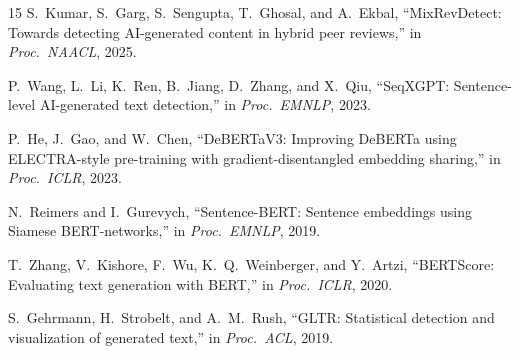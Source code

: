 \documentclass[conference]{IEEEtran}
\begin{document}
\begin{thebibliography}{15}
S.~Kumar, S.~Garg, S.~Sengupta, T.~Ghosal, and A.~Ekbal,
``{MixRevDetect}: Towards detecting {AI}-generated content in hybrid peer reviews,''
in \textit{Proc.\ NAACL}, 2025.

P.~Wang, L.~Li, K.~Ren, B.~Jiang, D.~Zhang, and X.~Qiu,
``{SeqXGPT}: Sentence-level {AI}-generated text detection,''
in \textit{Proc.\ EMNLP}, 2023.

P.~He, J.~Gao, and W.~Chen,
``{DeBERTaV3}: Improving {DeBERTa} using {ELECTRA}-style pre-training with gradient-disentangled embedding sharing,''
in \textit{Proc.\ ICLR}, 2023.

N.~Reimers and I.~Gurevych,
``{Sentence-BERT}: Sentence embeddings using {S}iamese {BERT}-networks,''
in \textit{Proc.\ EMNLP}, 2019.

T.~Zhang, V.~Kishore, F.~Wu, K.~Q.~Weinberger, and Y.~Artzi,
``{BERTScore}: Evaluating text generation with {BERT},''
in \textit{Proc.\ ICLR}, 2020.

S.~Gehrmann, H.~Strobelt, and A.~M.~Rush,
``{GLTR}: Statistical detection and visualization of generated text,''
in \textit{Proc.\ ACL}, 2019.

\end{thebibliography}
\end{document}
